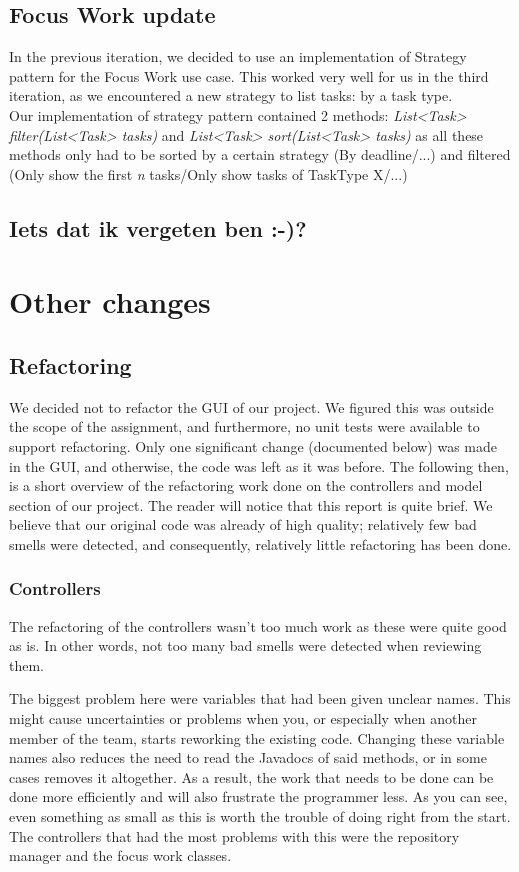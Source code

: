 		\subsection{Focus Work update}
			In the previous iteration, we decided to use an implementation of Strategy pattern for the Focus Work use case. This worked very well for us in the third iteration, as we encountered a new strategy to list tasks: by a task type.\\
			Our implementation of strategy pattern contained 2 methods: \emph{List<Task> filter(List<Task> tasks)} and \emph{List<Task> sort(List<Task> tasks)} as all these methods only had to be sorted by a certain strategy (By deadline/...) and filtered (Only show the first \emph{n} tasks/Only show tasks of TaskType X/...)\\
			
		\subsection{Iets dat ik vergeten ben :-)?}
	
	\section{Other changes}
		\subsection{Refactoring}
			We decided not to refactor the GUI of our project. We figured this was outside the scope of the assignment, and furthermore, no unit tests were available to support refactoring. Only one significant change (documented below) was made in the GUI, and otherwise, the code was left as it was before. The following then, is a short overview of the refactoring work done on the controllers and model section of our project. The reader will notice that this report is quite brief. We believe that our original code was already of high quality; relatively few bad smells were detected, and consequently, relatively little refactoring has been done.

			\subsubsection{Controllers}
				The refactoring of the controllers wasn't too much work as these were quite good as is. In other words, not too many bad smells were detected when reviewing them.
				
				The biggest problem here were variables that had been given unclear names. This might cause uncertainties or problems when you, or especially when another member of the team, starts reworking the existing code. Changing these variable names also reduces the need to read the Javadocs of said methods, or in some cases removes it altogether. As a result, the work that needs to be done can be done more efficiently and will also frustrate the programmer less. As you can see, even something as small as this is worth the trouble of doing right from the start. 
				The controllers that had the most problems with this were the repository manager and the focus work classes.
				
